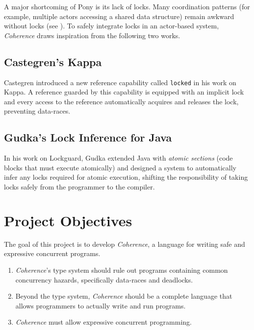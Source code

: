 A major shortcoming of Pony is its lack of locks. Many coordination patterns (for example, multiple actors accessing a shared data structure) remain awkward without locks (see ). To safely integrate locks in an actor-based system, \textit{Coherence} draws inspiration from the following two works.

\subsection{Castegren's Kappa}
Castegren introduced a new reference capability called \texttt{locked} in his work on Kappa\cite{kappa_system}. A reference guarded by this capability is equipped with an implicit lock and every access to the reference automatically acquires and releases the lock, preventing data-races.

\subsection{Gudka's Lock Inference for Java}
In his work on Lockguard\cite{gudka_thesis}, Gudka extended Java with \textit{atomic sections} (code blocks that must execute atomically) and designed a system to automatically infer any locks required for atomic execution, shifting the responsibility of taking locks safely from the programmer to the compiler. 

\section{Project Objectives} \label{sec:project_objectives}
The goal of this project is to develop \textit{Coherence}, a language for writing safe and expressive concurrent programs.

\begin{enumerate}
    \item \textit{Coherence}'s type system should rule out programs containing common concurrency hazards, specifically data-races and deadlocks.
    \item Beyond the type system, \textit{Coherence} should be a complete language that allows programmers to actually write and run programs.
    \item \textit{Coherence} must allow expressive concurrent programming. 
\end{enumerate}